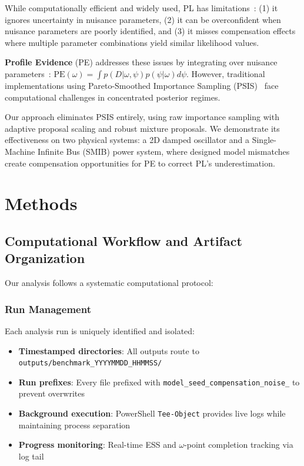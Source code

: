 \documentclass[conference]{IEEEtran}
\begin{document}
While computationally efficient and widely used, PL has limitations~\cite{murphy2000}: (1) it ignores uncertainty in nuisance parameters, (2) it can be overconfident when nuisance parameters are poorly identified, and (3) it misses compensation effects where multiple parameter combinations yield similar likelihood values.

\textbf{Profile Evidence} (PE) addresses these issues by integrating over nuisance parameters~\cite{gelman2013}: $\mathrm{PE}(\omega) = \int p(D|\omega,\psi) p(\psi|\omega) d\psi$. However, traditional implementations using Pareto-Smoothed Importance Sampling (PSIS)~\cite{vehtari2024} face computational challenges in concentrated posterior regimes.

Our approach eliminates PSIS entirely, using raw importance sampling with adaptive proposal scaling and robust mixture proposals. We demonstrate its effectiveness on two physical systems: a 2D damped oscillator and a Single-Machine Infinite Bus (SMIB) power system, where designed model mismatches create compensation opportunities for PE to correct PL's underestimation.

\section{Methods}

\subsection{Computational Workflow and Artifact Organization}

Our analysis follows a systematic computational protocol:

\subsubsection{Run Management}
Each analysis run is uniquely identified and isolated:
\begin{itemize}
\item \textbf{Timestamped directories}: All outputs route to \texttt{outputs/benchmark\_YYYYMMDD\_HHMMSS/}
\item \textbf{Run prefixes}: Every file prefixed with \texttt{model\_seed\_compensation\_noise\_} to prevent overwrites
\item \textbf{Background execution}: PowerShell \texttt{Tee-Object} provides live logs while maintaining process separation
\item \textbf{Progress monitoring}: Real-time ESS and $\omega$-point completion tracking via log tail
\end{itemize}
\end{document}
